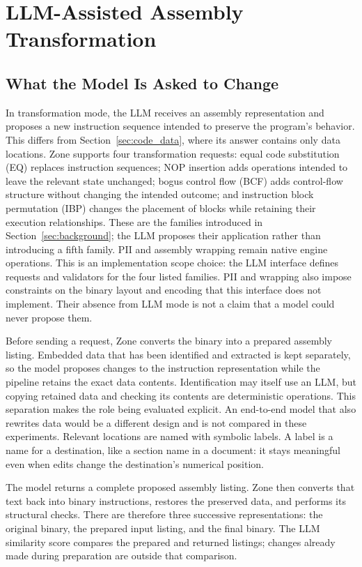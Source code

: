 \section{LLM-Assisted Assembly Transformation}\label{sec:llm}
\subsection{What the Model Is Asked to Change}
In transformation mode, the LLM receives an assembly representation and
proposes a new instruction sequence intended to preserve the program's
behavior. This differs from Section~\ref{sec:code_data}, where its answer
contains only data locations. Zone supports four transformation requests:
equal code substitution (EQ) replaces instruction sequences; NOP insertion
adds operations intended to leave the relevant state unchanged; bogus
control flow (BCF) adds control-flow structure without changing the intended
outcome; and instruction block permutation (IBP) changes the placement of
blocks while retaining their execution relationships. These are the
families introduced in Section~\ref{sec:background}; the LLM proposes their
application rather than introducing a fifth family. PII and assembly
wrapping remain native engine operations. This is an implementation scope
choice: the LLM interface defines requests and validators for the four
listed families. PII and wrapping also impose constraints on the binary
layout and encoding that this interface does not implement. Their absence
from LLM mode is not a claim that a model could never propose them.

Before sending a request, Zone converts the binary into a prepared
assembly listing. Embedded data that has been identified and extracted is
kept separately, so the model proposes changes to the instruction
representation while the pipeline retains the exact data contents.
Identification may itself use an LLM, but copying retained data and checking
its contents are deterministic operations. This separation makes the role
being evaluated explicit. An end-to-end model that also rewrites data would
be a different design and is not compared in these experiments.
Relevant locations are named with symbolic labels. A label is a name for
a destination, like a section name in a document: it stays meaningful even
when edits change the destination's numerical position.

The model returns a complete proposed assembly listing. Zone then converts
that text back into binary instructions, restores the preserved data, and
performs its structural checks. There are therefore three successive
representations: the original binary, the prepared input listing, and the
final binary. The LLM similarity score compares the prepared and returned
listings; changes already made during preparation are outside that comparison.

